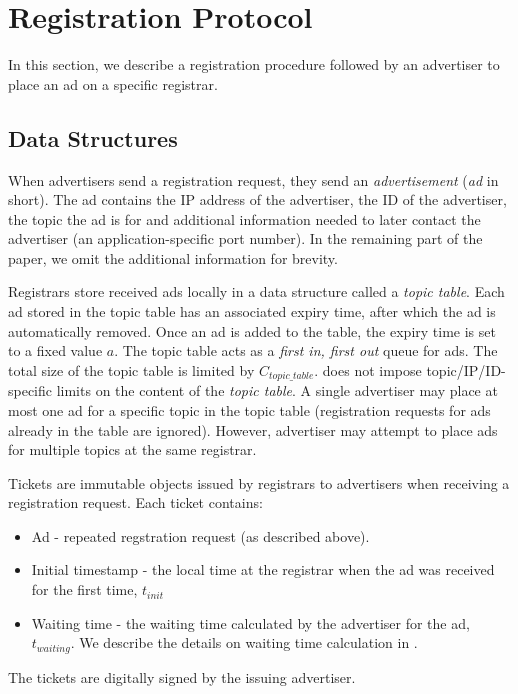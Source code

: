 \section{Registration Protocol}\label{sec:registration}
In this section, we describe a registration procedure followed by an advertiser to place an ad on a specific registrar. 
\subsection{Data Structures}
When advertisers send a registration request, they send an \emph{advertisement} (\emph{ad} in short). The ad contains the IP address of the advertiser, the ID of the advertiser, the topic the ad is for and additional information needed to later contact the advertiser (\eg an application-specific port number). In the remaining part of the paper, we omit the additional information for brevity. 

Registrars store received ads locally in a data structure called a \emph{topic table}. Each ad stored in the topic table has an associated expiry time, after which the ad is automatically removed. Once an ad is added to the table, the expiry time is set to a fixed value $a$. The topic table acts as a \emph{first in, first out} queue for ads. The total size of the topic table is limited by $C_\textit{topic\_table}$. \sysname does not impose topic/IP/ID-specific limits on the content of the \emph{topic table}. 
A single advertiser may place at most one ad for a specific topic in the topic table (registration requests for ads already in the table are ignored). However, advertiser may attempt to place ads for multiple topics at the same registrar.

Tickets are immutable objects issued by registrars to advertisers when receiving a registration request. Each ticket contains:
\begin{itemize}
    \item Ad - repeated regstration request (as described above). 
    \item Initial timestamp - the local time at the registrar when the ad was received for the first time, $t_\textit{init}$
    \item Waiting time - the waiting time calculated by the advertiser for the ad, $t_\textit{waiting}$. We describe the details on waiting time calculation in . 
\end{itemize}
The tickets are digitally signed by the issuing advertiser. 

